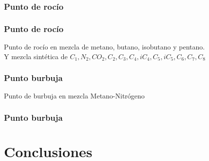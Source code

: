 \documentclass[aspectratio=1610,multi,rgb]{beamer}
\begin{document}
\subsubsection{Punto de rocío}
\begin{frame}
	\frametitle{Punto de rocío}
	Punto de rocío en mezcla de metano, butano, isobutano y pentano.\\
	Y mezcla sintética de $C_1, N_2, CO_2, C_2, C_3, C_4, iC_4, C_5, iC_5,
	C_6, C_7, C_8$ 
\end{frame}

\subsubsection{Punto burbuja}
\begin{frame}
	Punto de burbuja en mezcla Metano-Nitrógeno
	\frametitle{Punto burbuja}
\end{frame}

\section{Conclusiones}
\end{document}
